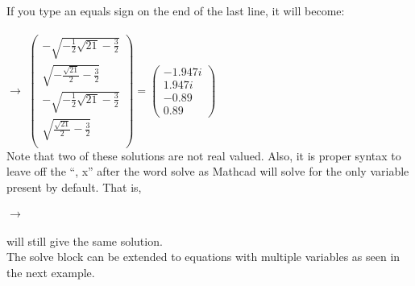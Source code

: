 {If you type an equals sign on the end of the last line, it will become:\\
\\
 $\rightarrow$
$
\left(
\begin{array}{c}
\displaystyle -\sqrt{-\frac{1}{2}\sqrt{21}-\frac{3}{2}}\\
\displaystyle \sqrt{-\frac{\sqrt{21}}{2}-\frac{3}{2}}\\
\displaystyle -\sqrt{-\frac{1}{2}\sqrt{21}-\frac{3}{2}}\\
\displaystyle \sqrt{\frac{\sqrt{21}}{2}-\frac{3}{2}}\\
\end{array}
\right)
=
\left(
\begin{array}{c}
-1.947i\\
1.947i\\
-0.89\\
0.89
\end{array}
\right)$
\\
Note that two of these solutions are not real valued.  Also, it is proper syntax to leave off the ``, x'' after the word solve as Mathcad will solve for the only variable present by default.  That is, \\ 
\\
 $\rightarrow$\\
\\
will still give the same solution.
}\\

The solve block can be extended to equations with multiple variables as seen in the next example.

